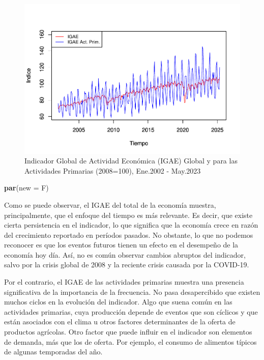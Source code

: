 \documentclass[
]{book}
\newenvironment{Shaded}{\begin{snugshade}}{\end{snugshade}}
\newcommand{\AttributeTok}[1]{\textcolor[rgb]{0.13,0.29,0.53}{#1}}
\newcommand{\FunctionTok}[1]{\textcolor[rgb]{0.13,0.29,0.53}{\textbf{#1}}}
\newcommand{\NormalTok}[1]{#1}
\begin{document}
\begin{figure}

{\centering \includegraphics{Notas-Series-Tiempo_files/figure-latex/fig1-1} 

}

\caption{Indicador Global de Actividad Económica (IGAE) Global y para las Actividades Primarias (2008=100), Ene.2002 - May.2023}\label{fig:fig1}
\end{figure}

\begin{Shaded}
\begin{Highlighting}[]
\FunctionTok{par}\NormalTok{(}\AttributeTok{new =}\NormalTok{ F)}
\end{Highlighting}
\end{Shaded}

Como se puede observar, el IGAE del total de la economía muestra, principalmente, que el enfoque del tiempo es más relevante. Es decir, que existe cierta persistencia en el indicador, lo que significa que la economía crece en razón del crecimiento reportado en períodos pasados. No obstante, lo que no podemos reconocer es que los eventos futuros tienen un efecto en el desempeño de la economía hoy día. Así, no es común observar cambios abruptos del indicador, salvo por la crisis global de 2008 y la reciente crisis causada por la COVID-19.

Por el contrario, el IGAE de las actividades primarias muestra una presencia significativa de la importancia de la frecuencia. No pasa desapercibido que existen muchos ciclos en la evolución del indicador. Algo que suena común en las actividades primarias, cuya producción depende de eventos que son cíclicos y que están asociados con el clima u otros factores determinantes de la oferta de productos agrícolas. Otro factor que puede influir en el indicador son elementos de demanda, más que los de oferta. Por ejemplo, el consumo de alimentos típicos de algunas temporadas del año.
\end{document}

